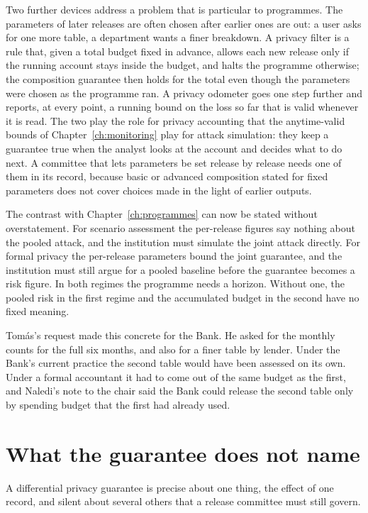 Two further devices address a problem that is particular to programmes. The
parameters of later releases are often chosen after earlier ones are out: a user
asks for one more table, a department wants a finer breakdown. A privacy filter is
a rule that, given a total budget fixed in advance, allows each new release only if
the running account stays inside the budget, and halts the programme otherwise;
the composition guarantee then holds for the total even though the parameters were
chosen as the programme ran. A privacy odometer goes one step further and reports,
at every point, a running bound on the loss so far that is valid whenever it is
read. The two play the role for privacy accounting that the anytime-valid bounds of
Chapter~\ref{ch:monitoring} play for attack simulation: they keep a guarantee true
when the analyst looks at the account and decides what to do next. A committee
that lets parameters be set release by release needs one of them in its record,
because basic or advanced composition stated for fixed parameters does not cover
choices made in the light of earlier outputs.

The contrast with Chapter~\ref{ch:programmes} can now be stated without
overstatement. For scenario assessment the per-release figures say nothing about
the pooled attack, and the institution must simulate the joint attack directly.
For formal privacy the per-release parameters bound the joint guarantee, and the
institution must still argue for a pooled baseline before the guarantee becomes a
risk figure. In both regimes the programme needs a horizon. Without one, the
pooled risk in the first regime and the accumulated budget in the second have no
fixed meaning.

Tomás's request made this concrete for the Bank. He asked for the monthly counts
for the full six months, and also for a finer table by lender. Under the Bank's
current practice the second table would have been assessed on its own. Under a
formal accountant it had to come out of the same budget as the first, and Naledi's
note to the chair said the Bank could release the second table only by spending
budget that the first had already used.

\section{What the guarantee does not name}\label{c10:sec-unnamed}

A differential privacy guarantee is precise about one thing, the effect of one
record, and silent about several others that a release committee must still
govern.

